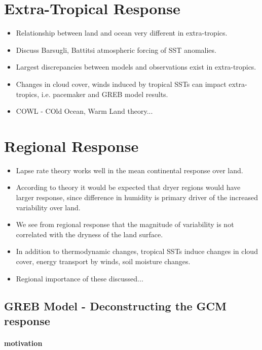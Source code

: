 \section{Extra-Tropical Response}
\begin{itemize}
	\item Relationship between land and ocean very different in extra-tropics.
	\item Discuss Barsugli, Battitsi atmospheric forcing of SST anomalies.
	\item Largest discrepancies between models and observations exist in 
		extra-tropics.
	\item Changes in cloud cover, winds induced by tropical SSTs can impact 
		extra-tropics, i.e. pacemaker and GREB model results.
	\item COWL - COld Ocean, Warm Land theory...
\end{itemize}


\section{Regional Response}

\begin{itemize}
	\item Lapse rate theory works well in the mean continental response over 
		land.
	\item According to theory it would be expected that dryer regions would have 
		larger response, since difference in humidity is primary driver of the 
		increased variability over land.
	\item We see from regional response that the magnitude of variability is not 
		correlated with the dryness of the land surface.
	\item In addition to thermodynamic changes, tropical SSTs induce changes in 
		cloud cover, energy transport by winds, soil moisture changes.
	\item Regional importance of these discussed...
\end{itemize}


\subsection{GREB Model - Deconstructing the GCM response}
\paragraph{motivation}

